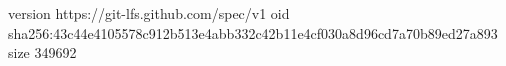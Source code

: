 version https://git-lfs.github.com/spec/v1
oid sha256:43c44e4105578c912b513e4abb332c42b11e4cf030a8d96cd7a70b89ed27a893
size 349692

